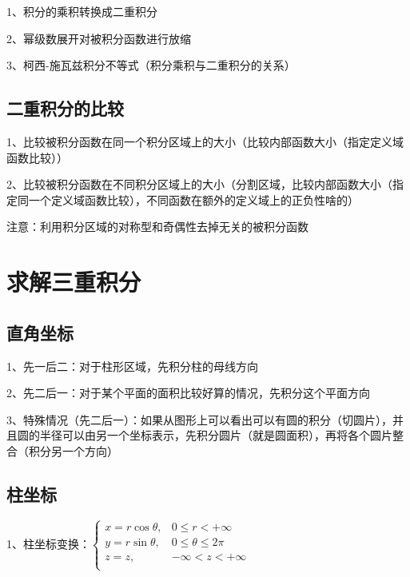 1、积分的乘积转换成二重积分

2、幂级数展开对被积分函数进行放缩

3、柯西-施瓦兹积分不等式（积分乘积与二重积分的关系）



\subsection{二重积分的比较}

1、比较被积分函数在同一个积分区域上的大小（比较内部函数大小（指定定义域函数比较））

2、比较被积分函数在不同积分区域上的大小（分割区域，比较内部函数大小（指定同一个定义域函数比较），不同函数在额外的定义域上的正负性啥的）

注意：利用积分区域的对称型和奇偶性去掉无关的被积分函数



\section{求解三重积分}



\subsection{直角坐标}

1、先一后二：对于柱形区域，先积分柱的母线方向

2、先二后一：对于某个平面的面积比较好算的情况，先积分这个平面方向

3、特殊情况（先二后一）：如果从图形上可以看出可以有圆的积分（切圆片），并且圆的半径可以由另一个坐标表示，先积分圆片（就是圆面积），再将各个圆片整合（积分另一个方向）



\subsection{柱坐标}

1、柱坐标变换：$\begin{cases} x=r \cos \theta, & 0 \leqslant r < +\infty \\ y=r \sin \theta,& 0 \leqslant \theta \leqslant 2 \pi \\ z=z, &  -\infty<z<+\infty \\ \end{cases}$

